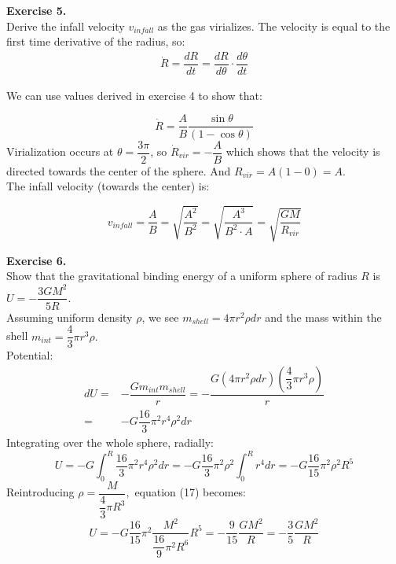 \documentclass[a4paper]{article}
\begin{document}
\noindent \textbf{Exercise 5.}\\
Derive the infall velocity $v_{infall}$ as the gas virializes. The velocity is equal to the first time derivative of the radius, so:
\begin{align*}
\dot{R} = \dfrac{dR}{dt} = \dfrac{dR}{d \theta} \cdot \dfrac{d \theta}{dt}
\end{align*}

\noindent We can use values derived in exercise 4 to show that:

\begin{equation}
\dot{R} = \dfrac{A}{B} \dfrac{\sin \theta}{(1-\cos \theta)}
\end{equation}
Virialization occurs at $ \theta = \dfrac{3 \pi}{2}$, so $\dot{R}_{vir} = - \dfrac{A}{B}$ which shows that the velocity is directed towards the center of the sphere. And $R_{vir} = A(1-0) = A.$\\
The infall velocity (towards the center) is:

\begin{equation}
v_{infall} = \dfrac{A}{B} = \sqrt{\dfrac{A^2}{B^2}} = \sqrt{\dfrac{A^3}{B^2 \cdot A}} = \sqrt{\dfrac{GM}{R_{vir}}}
\end{equation}

\noindent \textbf{Exercise 6.}\\
Show that the gravitational binding energy of a uniform sphere of radius $R$ is $U = - \dfrac{3GM^2}{5R}$.\\
Assuming uniform density $\rho$, we see $m_{shell} = 4 \pi r^2 \rho dr$ and the mass within the shell $m_{int} = \dfrac{4}{3} \pi r^3 \rho.$\\
Potential:
\begin{align*}
dU =& - \dfrac{Gm_{int}m_{shell}}{r} = - \dfrac{G(4 \pi r^2 \rho dr)(\dfrac{4}{3} \pi r^3 \rho)}{r}\\
=& - G \dfrac{16}{3} \pi^2 r^4 \rho^2 dr
\end{align*}
Integrating over the whole sphere, radially:
\begin{equation}
U = -G \int_0^R \dfrac{16}{3} \pi^2 r^4 \rho^2 dr = -G \dfrac{16}{3} \pi^2 \rho^2 \int_0^R r^4 dr = -G \dfrac{16}{15} \pi^2 \rho^2 R^5
\end{equation}
Reintroducing $\rho = \dfrac{M}{\dfrac{4}{3} \pi R^3},$ equation (17) becomes:
\begin{equation}
U = - G \dfrac{16}{15} \pi^2 \dfrac{M^2}{\dfrac{16}{9}\pi^2 R^6}R^5 = - \dfrac{9}{15} \dfrac{GM^2}{R} = - \dfrac{3}{5} \dfrac{GM^2}{R}
\end{equation}
\end{document}
